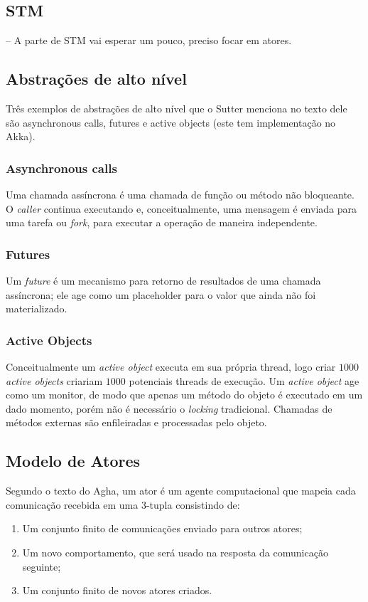 \documentclass[]{article}
\begin{document}
	\subsection{STM}
		-- A parte de STM vai esperar um pouco, preciso focar em atores.
	\subsection{Abstrações de alto nível}
		Três exemplos de abstrações de alto nível que o Sutter menciona no texto dele são asynchronous calls, 
		futures e active objects (este tem implementação no Akka).
		\subsubsection{Asynchronous calls}
			Uma chamada assíncrona é uma chamada de função ou método não bloqueante. O \textit{caller} continua
			executando e, conceitualmente, uma mensagem é enviada para uma tarefa ou \textit{fork}, para executar
			a operação de maneira independente.
		\subsubsection{Futures}
			Um \textit{future} é um mecanismo  para retorno de resultados de uma chamada assíncrona; ele age como um
			placeholder para o valor que ainda não foi materializado.
		\subsubsection{Active Objects}
			Conceitualmente um \textit{active object} executa em sua própria thread, logo criar $1000$ \textit{active objects}
			criariam $1000$ potenciais threads de execução. Um \textit{active object} age como um monitor, de modo que
			apenas um método do objeto é executado em um dado momento, porém não é necessário o \textit{locking} tradicional.
			Chamadas de métodos externas são enfileiradas e processadas pelo objeto.
		
	\subsection{Modelo de Atores}

		\par Segundo o texto do Agha, um ator é um agente computacional que mapeia cada comunicação recebida em uma
		3-tupla consistindo de:
		\begin{enumerate}
			\item Um conjunto finito de comunicações enviado para outros atores;
			\item Um novo comportamento, que será usado na resposta da comunicação seguinte;
			\item Um conjunto finito de novos atores criados.
		\end{enumerate}
\end{document}
